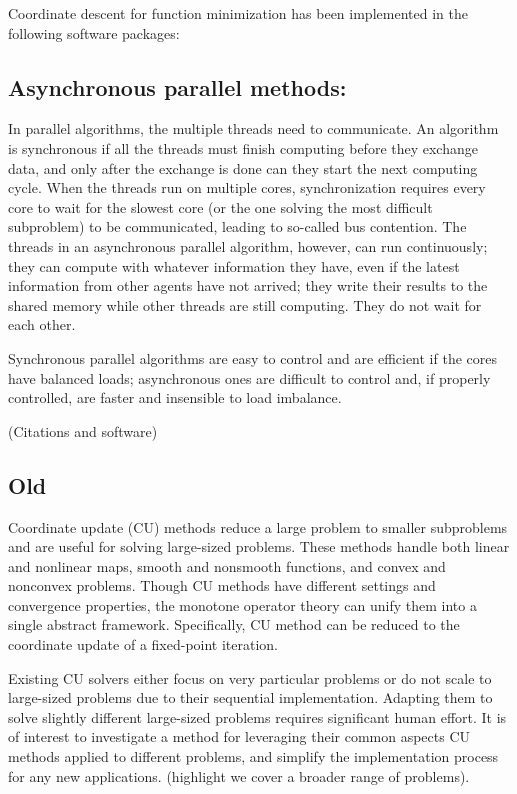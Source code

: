 Coordinate descent for function minimization has been implemented in the following software packages: 

\subsection*{Asynchronous parallel methods:}  

In  parallel algorithms, the multiple threads need to communicate. An algorithm is synchronous if all the  threads must finish computing before they exchange data, and only after the exchange is done can they start the next computing cycle. When the threads run on multiple cores, synchronization requires every core to wait for the slowest core
(or the one solving the most difficult subproblem) to be communicated,  leading to so-called  bus contention. The threads in an asynchronous parallel algorithm, however, can run continuously; they can compute with whatever information they have, even if the latest information from other agents
have not arrived; they write their results to the shared memory while other threads are still computing. They do not wait for each other.

Synchronous parallel algorithms are easy to control and are efficient if the cores have balanced loads; asynchronous  ones are difficult to control and, if properly controlled, are faster and insensible to load imbalance.

(Citations and software)

\subsection{Old}
Coordinate update (CU) methods reduce a large problem to smaller subproblems and are useful for solving large-sized problems.
These methods handle both linear and nonlinear maps, smooth and nonsmooth functions, and convex and nonconvex problems. 
Though CU methods have different settings and convergence properties,  the monotone operator theory can unify them into a single abstract framework. 
Specifically, CU method can be reduced to the coordinate update of a fixed-point iteration. 


Existing CU solvers \citep{hsieh2015passcode,jaggi2014communication,recht2011hogwild} either focus on very particular problems or do not scale to large-sized problems due to their sequential implementation. 
Adapting them to solve slightly different large-sized problems requires significant human effort. 
It is of interest to investigate a method for leveraging their common aspects CU methods applied to different problems, and simplify the implementation process for any new applications. (highlight we cover a broader range of problems).

